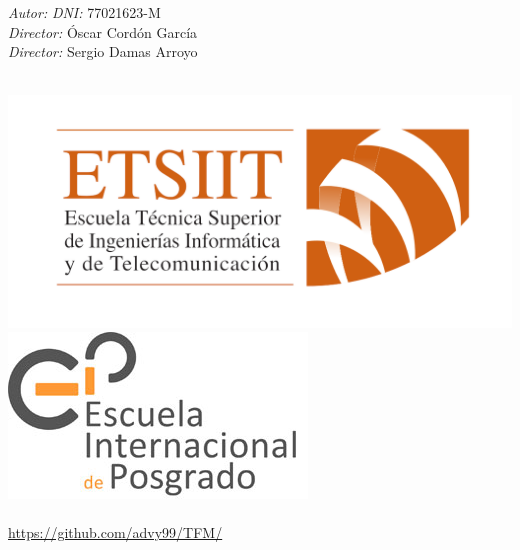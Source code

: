 \documentclass[12pt, spanish]{article}
\begin{document}
\begin{titlepage}
    \begin{minipage}{\textwidth}
		\begin{center}
			\large
			\emph{Autor:} \theauthor \hspace{0.5 cm}
			\emph{DNI:} 77021623-M \vspace{0.2cm} \\
			\emph{Director:} Óscar Cordón García \\
			\emph{Director:} Sergio Damas Arroyo \\
		\end{center}
    \end{minipage}\\[0.5cm]
	 \hspace*{-1cm} \includegraphics[scale = 0.20]{logo_etsiit.png} \quad \includegraphics[scale = 0.4]{posgrado.jpg}\\[0.3 cm]
    {\large \thedate}\\[0.5cm]
	 \url{https://github.com/advy99/TFM/}
    \doclicenseThis
\end{titlepage}





\pagebreak


\pagestyle{fancy}


\end{document}
